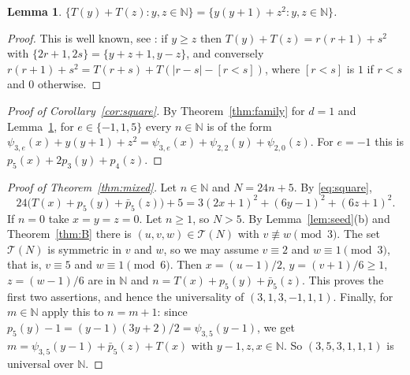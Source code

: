 \documentclass[11pt]{amsart}
\newtheorem{lemma}[theorem]{Lemma}
\theoremstyle{definition}
\theoremstyle{remark}
\newcommand{\N}{\mathbb{N}}
\newcommand{\cT}{\mathcal{T}}
\newcommand{\pb}{\bar p_5}
\newcommand{\Tr}{T}
\begin{document}
\begin{lemma}\label{lem:TT}
$\{\Tr(y)+\Tr(z):y,z\in\N\}=\{y(y+1)+z^2:y,z\in\N\}$.
\end{lemma}

\begin{proof}
This is well known, see \cite[(1.5)]{S15}: if $y\ge z$ then
$\Tr(y)+\Tr(z)=r(r+1)+s^2$ with $\{2r+1,2s\}=\{y+z+1,y-z\}$, and conversely
$r(r+1)+s^2=\Tr(r+s)+\Tr(|r-s|-[r<s])$, where $[r<s]$ is $1$ if $r<s$ and $0$ otherwise.
\end{proof}

\begin{proof}[Proof of Corollary~\ref{cor:square}]
By Theorem~\ref{thm:family} for $d=1$ and Lemma~\ref{lem:TT}, for $e\in\{-1,1,5\}$ every $n\in\N$ is of the form
$\psi_{3,e}(x)+y(y+1)+z^2=\psi_{3,e}(x)+\psi_{2,2}(y)+\psi_{2,0}(z)$. For $e=-1$ this is $p_5(x)+2p_3(y)+p_4(z)$.
\end{proof}

\begin{proof}[Proof of Theorem~\ref{thm:mixed}]
Let $n\in\N$ and $N=24n+5$. By \eqref{eq:square},
\[
24\bigl(\Tr(x)+p_5(y)+\pb(z)\bigr)+5=3(2x+1)^2+(6y-1)^2+(6z+1)^2 .
\]
If $n=0$ take $x=y=z=0$. Let $n\ge 1$, so $N>5$.
By Lemma~\ref{lem:seed}(b) and Theorem~\ref{thm:B} there is $(u,v,w)\in\cT(N)$ with $v\not\equiv w\pmod 3$.
The set $\cT(N)$ is symmetric in $v$ and $w$, so we may assume $v\equiv 2$ and $w\equiv 1\pmod 3$, that is,
$v\equiv 5$ and $w\equiv 1\pmod 6$. Then $x=(u-1)/2$, $y=(v+1)/6\ge 1$, $z=(w-1)/6$ are in $\N$ and
$n=\Tr(x)+p_5(y)+\pb(z)$. This proves the first two assertions, and hence the universality of $(3,1,3,-1,1,1)$.
Finally, for $m\in\N$ apply this to $n=m+1$: since $p_5(y)-1=(y-1)(3y+2)/2=\psi_{3,5}(y-1)$, we get
$m=\psi_{3,5}(y-1)+\pb(z)+\Tr(x)$ with $y-1,z,x\in\N$. So $(3,5,3,1,1,1)$ is universal over $\N$.
\end{proof}
\end{document}
